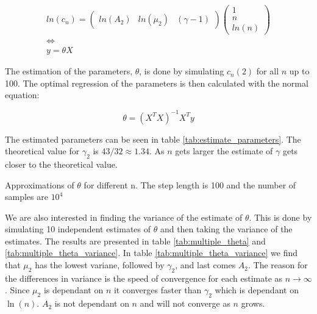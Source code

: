 \documentclass[a4paper]{article}
\begin{document}
\begin{equation}
    \begin{gathered}
        ln(c_n)=
        \begin{pmatrix}
            ln(A_2) & ln(\mu_2) & (\gamma -1)
        \end{pmatrix}
        \begin{pmatrix}
            1 \\
            n \\
            ln(n)
        \end{pmatrix}
        \\
        \iff
        \\
        y = \theta X
    \end{gathered}
\end{equation}

The estimation of the parameters, $\theta$, is done by simulating $c_n(2)$ for all $n$ up to 100. The optimal regression of the parameters is then calculated with the normal equation:

\begin{equation}
    \theta = (X^T X)^{-1}X^T y    
\end{equation}

The estimated parameters can be seen in table \ref{tab:estimate_parameters}. The theoretical value for $\gamma_2$ is $43/32 \approx 1.34$. As $n$ gets larger the estimate of $\gamma$ gets closer to the theoretical value.

\begin{table}[H]
    \centering
    \caption{Approximations of $\theta$ for different n. The step length is 100 and the number of samples are $10^4$}
    \label{tab:estimate_parameters}
    
\end{table}

We are also interested in finding the variance of the estimate of $\theta$. This is done by simulating 10 independent estimates of $\theta$ and then taking the variance of the estimates. The results are presented in table \ref{tab:multiple_theta} and \ref{tab:multiple_theta_variance}. In table \ref{tab:multiple_theta_variance} we find that $\mu_2$ has the lowest variane, followed by $\gamma_2$, and last comes $A_2$. The reason for the differences in variance is the speed of convergence for each estimate as $n \to \infty$. Since $\mu_2$ is dependant on $n$ it converges faster than $\gamma_2$ which is dependant on $\ln(n)$. $A_2$ is not dependant on $n$ and will not converge as $n$ grows.
\end{document}
